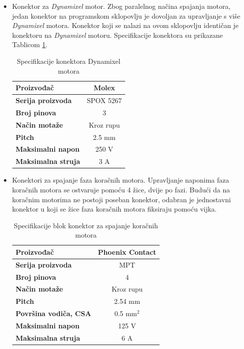 \documentclass[11pt,a4paper]{article}
\begin{document}
\begin{center}
\begin{itemize}
		
		\item Konektor za \textit{Dynamixel} motor. Zbog paralelnog načina spajanja motora, jedan konektor na programskom sklopovlju je dovoljan za upravljanje s više \textit{Dynamixel} motora. Konektor koji se nalazi na ovom sklopovlju identičan je konektoru na \textit{Dynamixel} motoru. Specifikacije konektora su prikazane Tablicom \ref{tab:specifikacija_connector_dynamixel}.
		
\begin{table}[H]
	\centering
	\caption{Specifikacije konektora Dynamixel motora}
	\label{tab:specifikacija_connector_dynamixel}
	\begin{tabular}{|l|c|}
		\hline
		\textbf{Proizvođač} & Molex \\ \hline 
		\textbf{Serija proizvoda} & SPOX 5267 \\ \hline  
		\textbf{Broj pinova} & 3 \\ \hline 
		\textbf{Način motaže} & Kroz rupu    \\ \hline
		\textbf{Pitch} & 2.5 mm    \\ \hline 
		\textbf{Maksimalni napon} & 250 V \\ \hline 
		\textbf{Maksimalna struja} & 3 A \\ \hline
	\end{tabular}
\end{table}
		
		\item Konektori za spajanje faza koračnih motora. Upravljanje naponima faza koračnih motora se ostvaruje pomoću 4 žice, dvije po fazi. Budući da na koračnim motorima ne postoji poseban konektor, odabran je jednostavni konektor u koji se žice faza koračnih motora fiksiraju pomoću vijka.
		
\begin{table}[H]
	\centering
	\caption{Specifikacije blok konektor za spajanje koračnih motora}
	\label{tab:specifikacija_connector_terminal}
	\begin{tabular}{|l|c|}
		\hline
		\textbf{Proizvođač} & Phoenix Contact \\ \hline 
		\textbf{Serija proizvoda} & MPT \\ \hline 
		\textbf{Broj pinova} & 4 \\ \hline 
		\textbf{Način motaže} & Kroz rupu    \\ \hline
		\textbf{Pitch} & 2.54 mm    \\ \hline 
		\textbf{Površina vodiča, CSA} & 0.5 mm$^2$     \\ \hline 
		\textbf{Maksimalni napon} & 125 V \\ \hline 
		\textbf{Maksimalna struja} & 6 A \\ \hline
	\end{tabular}
\end{table}
		

\end{itemize}
\end{center}
\end{document}
